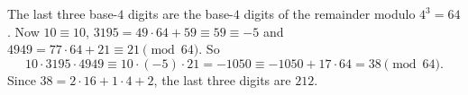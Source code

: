 The last three base-$4$ digits are the base-$4$ digits of the remainder modulo $4^3=64$. Now $10\equiv10$, $3195=49\cdot64+59\equiv59\equiv-5$ and $4949=77\cdot64+21\equiv21\pmod{64}$. So
\[
10\cdot3195\cdot4949\equiv10\cdot(-5)\cdot21=-1050\equiv-1050+17\cdot64=38\pmod{64}.
\]
Since $38=2\cdot16+1\cdot4+2$, the last three digits are $\boxed{212}$.
